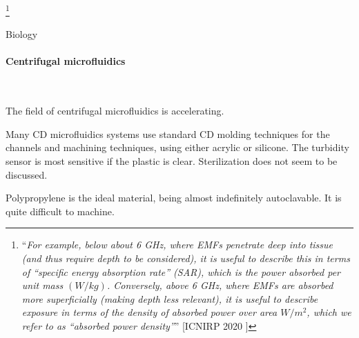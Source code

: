 \documentclass[fleqn,10pt]{article}
\begin{document}
\begin{multicols}{1}
\footnote{``{\it{For example, below about 6 GHz, where EMFs penetrate deep into tissue (and thus require depth to be considered), it is useful to describe this in terms of “specific energy absorption rate” (SAR), which is the power absorbed per unit mass $(W/kg)$. Conversely, above 6 GHz, where EMFs are absorbed more superficially (making depth less relevant), it is useful to describe exposure in terms of the density of absorbed power over area $W/m^2$, which we refer to as “absorbed power density”}}'' [ICNIRP 2020 \faExternalLink]}

\end{multicols}















\clearpage
\begin{multicols}{1}
{\Large Biology}\\

\paragraph{\textbf{Centrifugal microfluidics}}\

The field of centrifugal microfluidics is accelerating. 

Many CD microfluidics systems use standard CD molding techniques for the channels and machining techniques, using either acrylic or silicone. The turbidity sensor is most sensitive if the plastic is clear. Sterilization does not seem to be discussed. 

Polypropylene is the ideal material, being almost indefinitely autoclavable. It is quite difficult to machine.

\end{multicols}
\end{document}
